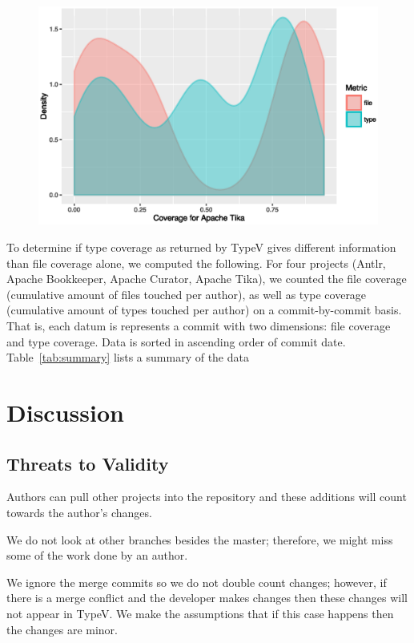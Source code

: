 \documentclass[conference]{IEEEtran}
\begin{document}
\begin{figure}[!h]
\centering
\includegraphics[width=\columnwidth]{tika-density}
\caption{}
\end{figure}

To determine if type coverage as returned by TypeV gives different information than file coverage alone, we computed the following. For four projects (Antlr, Apache Bookkeeper, Apache Curator, Apache Tika), we counted the file coverage (cumulative amount of files touched per author), as well as type coverage (cumulative amount of types touched per author) on a commit-by-commit basis. That is, each datum is represents a commit with two dimensions: file coverage and type coverage. Data is sorted in ascending order of commit date. Table~\ref{tab:summary} lists a summary of the data 

\section{Discussion}

\subsection{Threats to Validity}

Authors can pull other projects into the repository and these additions will count towards the author's changes. 

We do not look at other branches besides the master; therefore, we might miss some of the work done by an author.

We ignore the merge commits so we do not double count changes; however, if there is a merge conflict and the developer makes changes then these changes will not appear in TypeV. We make the assumptions that if this case happens then the changes are minor.
\end{document}
